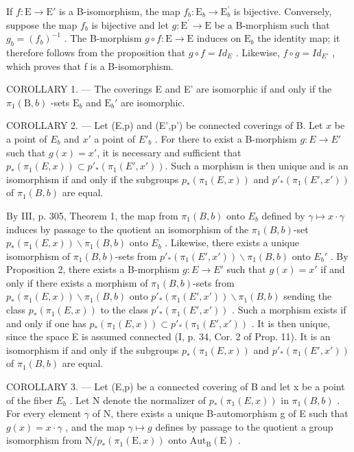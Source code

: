 If \(f\colon \mathrm{E}\to \mathrm{E}'\) is a B-isomorphism, the map \(f_{b}\colon \mathrm{E}_{b}\to \mathrm{E}_{b}^{\prime}\) is bijective. Conversely, suppose the map \(f_{b}\) is bijective and let \(g\colon \mathrm{E}^{\prime}\to \mathrm{E}\) be a B-morphism such that \(g_{b} = (f_{b})^{-1}\) . The B-morphism \(g\circ f\colon \mathrm{E}\to \mathrm{E}\) induces on \(\mathrm{E}_b\) the identity map; it therefore follows from the proposition that \(g \circ f = Id_{E}\) . Likewise, \(f \circ g = Id_{E'}\) , which proves that f is a B-isomorphism.

COROLLARY 1. --- The coverings E and E' are isomorphic if and only if the \(\pi_1(\mathrm{B},b)\) -sets \(\mathrm{E}_b\) and \(\mathrm{E}_b'\) are isomorphic.

COROLLARY 2. --- Let (E,p) and (E',p') be connected coverings of B. Let \(x\) be a point of \(E_{b}\) and \(x'\) a point of \(E'_{b}\) . For there to exist a B-morphism \(g\colon E\to E'\) such that \(g(x)=x'\), it is necessary and sufficient that \(p_{*}(\pi_{1}(E,x))\subset p'_{*}(\pi_{1}(E',x'))\). Such a morphism is then unique and is an isomorphism if and only if the subgroups \(p_{*}(\pi_{1}(E,x))\) and \(p'_{*}(\pi_{1}(E',x'))\) of \(\pi_{1}(B,b)\) are equal.

By III, p. 305, Theorem 1, the map from \(\pi_1(B,b)\) onto \(E_b\) defined by \(\gamma \mapsto x \cdot \gamma\) induces by passage to the quotient an isomorphism of the \(\pi_1(B,b)\)-set \(p_*(\pi_1(E,x)) \backslash \pi_1(B,b)\) onto \(E_b\) . Likewise, there exists a unique isomorphism of \(\pi_1(B,b)\)-sets from \(p'_{*}(\pi_1(E',x')) \backslash \pi_1(B,b)\) onto \(E_b'\) . By Proposition 2, there exists a B-morphism \(g\colon E\to E'\) such that \(g(x)=x'\) if and only if there exists a morphism of \(\pi_1(B,b)\)-sets from \(p_*(\pi_1(E,x)) \backslash \pi_1(B,b)\) onto \(p'_{*}(\pi_1(E',x')) \backslash \pi_1(B,b)\) sending the class \(p_*(\pi_1(E,x))\) to the class \(p'_{*}(\pi_1(E',x'))\) . Such a morphism exists if and only if one has \(p_*(\pi_1(E,x)) \subset p'_{*}(\pi_1(E',x'))\) . It is then unique, since the space E is assumed connected (I, p. 34, Cor. 2 of Prop. 11). It is an isomorphism if and only if the subgroups \(p_*(\pi_1(E,x))\) and \(p'_{*}(\pi_1(E',x'))\) of \(\pi_1(B,b)\) are equal.

COROLLARY 3. --- Let (E,p) be a connected covering of B and let x be a point of the fiber \(E_{b}\) . Let N denote the normalizer of \(p_{*}(\pi_{1}(E,x))\) in \(\pi_{1}(B,b)\) . For every element \(\gamma\) of N, there exists a unique B-automorphism g of E such that \(g(x) = x \cdot \gamma\) , and the map \(\gamma \mapsto g\) defines by passage to the quotient a group isomorphism from \(\mathrm{N}/p_{*}(\pi_{1}(\mathrm{E},x))\) onto \(\mathrm{Aut}_{\mathrm{B}}(\mathrm{E})\) .

